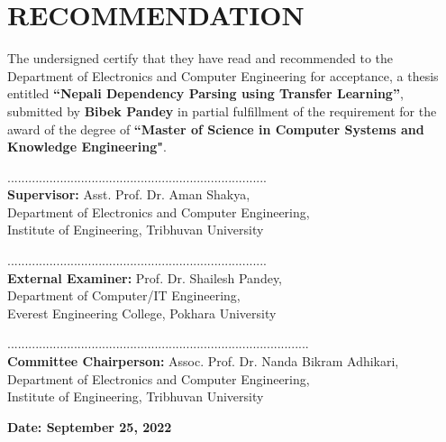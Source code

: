 \chapter*{RECOMMENDATION}
The undersigned certify that they have read and recommended to the Department of
Electronics and Computer Engineering for acceptance, a thesis entitled \textbf{``Nepali Dependency Parsing using Transfer Learning''}, submitted by \textbf{Bibek Pandey} in partial fulfillment of the requirement for
the award of the degree of \textbf{``Master of Science in Computer Systems and Knowledge Engineering"}.\par
\vspace{1.5cm}
..........................................................................\\
\textbf{Supervisor:} Asst. Prof. Dr. Aman Shakya,\\Department of Electronics and Computer Engineering,\\Institute of Engineering, Tribhuvan University\par
\vspace{1.5cm}
..........................................................................\\
\textbf{External Examiner:} Prof. Dr. Shailesh Pandey,\\Department of Computer/IT Engineering,\\ Everest Engineering College, Pokhara University\par

\vspace{1.5cm}
......................................................................................\\
\textbf{Committee Chairperson:} Assoc. Prof. Dr. Nanda Bikram Adhikari,\\Department of Electronics and Computer Engineering,\\Institute of Engineering, Tribhuvan University

\vspace{0.8cm}
\textbf{Date: September 25, 2022}

\newpage
